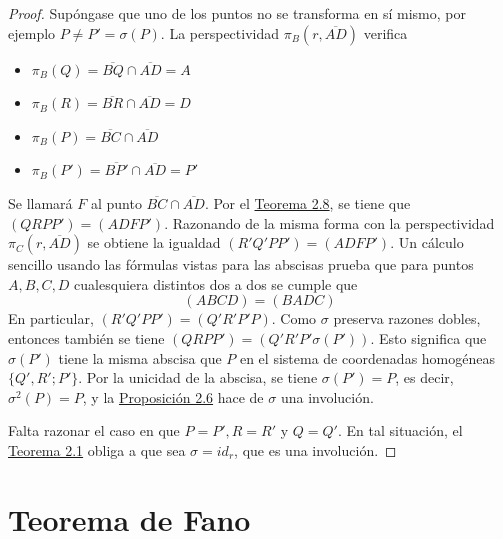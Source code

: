 \documentclass[12pt]{report}
\theoremstyle{definition}
\theoremstyle{definition}
\theoremstyle{remark}
\begin{document}
\begin{proof}
Supóngase que uno de los puntos no se transforma en sí mismo, por ejemplo $P \neq P' = \sigma(P)$. La perspectividad $\pi_B(r,\overline{AD})$ verifica

\setlength{\columnsep}{0cm}
\setlength{\columnseprule}{0pt}

\begin{multicols}{2}

\begin{itemize}
    \item $\pi_B(Q) = \overline{BQ} \cap \overline{AD} = A$
    \item $\pi_B(R) = \overline{BR} \cap \overline{AD} = D$
\end{itemize}

\columnbreak

\begin{itemize}
    \item $\pi_B(P) = \overline{BC} \cap \overline{AD}$
    \item $\pi_B(P') = \overline{BP'} \cap \overline{AD} = P'$
\end{itemize}

\end{multicols}
Se llamará $F$ al punto $\overline{BC} \cap \overline{AD}$. Por el \hyperref[teo2.8.]{\color{blue}Teorema 2.8}, se tiene que $(QRPP') = (ADFP')$. Razonando de la misma forma con la perspectividad $\pi_C(r,\overline{AD})$ se obtiene la igualdad $(R'Q'PP') = (ADFP')$. Un cálculo sencillo usando las fórmulas vistas para las abscisas prueba que para puntos $A,B,C,D$ cualesquiera distintos dos a dos se cumple que
\[(ABCD) = (BADC)\]
En particular, $(R'Q'PP') = (Q'R'P'P)$. Como $\sigma$ preserva razones dobles, entonces también se tiene $(QRPP') = (Q'R'P'\sigma(P'))$. Esto significa que $\sigma(P')$ tiene la misma abscisa que $P$ en el sistema de coordenadas homogéneas $\{Q',R';P'\}$. Por la unicidad de la abscisa, se tiene $\sigma(P') = P$, es decir, $\sigma^2(P) = P$, y la \hyperref[prop2.6.]{\color{blue}Proposición 2.6} hace de $\sigma$ una involución.

\vspace{2mm}
Falta razonar el caso en que $P = P', R = R'$ y $Q = Q'$. En tal situación, el \hyperref[teo2.1.]{\color{blue}Teorema 2.1} obliga a que sea $\sigma = id_r$, que es una involución.
\end{proof}

\section{Teorema de Fano}
\end{document}
